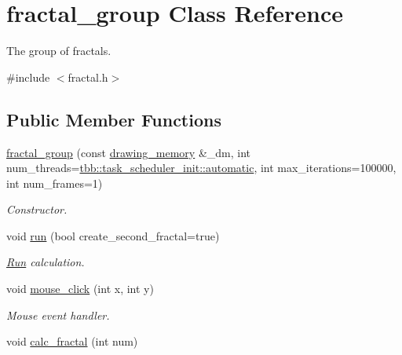 \hypertarget{classfractal__group}{}\section{fractal\+\_\+group Class Reference}
\label{classfractal__group}


The group of fractals.  




{\ttfamily \#include $<$fractal.\+h$>$}

\subsection*{Public Member Functions}
\begin{DoxyCompactItemize}
\item 
\hypertarget{classfractal__group_afb2577f7cdba0d281b49036b21a42886}{}\hyperlink{classfractal__group_afb2577f7cdba0d281b49036b21a42886}{fractal\+\_\+group} (const \hyperlink{classdrawing__memory}{drawing\+\_\+memory} \&\+\_\+dm, int num\+\_\+threads=\hyperlink{classtbb_1_1task__scheduler__init_a945886f5ef48300a8ebff2d077c166b1}{tbb\+::task\+\_\+scheduler\+\_\+init\+::automatic}, int max\+\_\+iterations=100000, int num\+\_\+frames=1)\label{classfractal__group_afb2577f7cdba0d281b49036b21a42886}

\begin{DoxyCompactList}\small\item\em Constructor. \end{DoxyCompactList}\item 
\hypertarget{classfractal__group_a73046c8830d160bbf2954e359be768a3}{}void \hyperlink{classfractal__group_a73046c8830d160bbf2954e359be768a3}{run} (bool create\+\_\+second\+\_\+fractal=true)\label{classfractal__group_a73046c8830d160bbf2954e359be768a3}

\begin{DoxyCompactList}\small\item\em \hyperlink{structRun}{Run} calculation. \end{DoxyCompactList}\item 
\hypertarget{classfractal__group_ad6ad304f5e437da450839b9e8170c50b}{}void \hyperlink{classfractal__group_ad6ad304f5e437da450839b9e8170c50b}{mouse\+\_\+click} (int x, int y)\label{classfractal__group_ad6ad304f5e437da450839b9e8170c50b}

\begin{DoxyCompactList}\small\item\em Mouse event handler. \end{DoxyCompactList}\item 
\hypertarget{classfractal__group_a8ba13e0c275f96bbd8365fc5c0adf670}{}void \hyperlink{classfractal__group_a8ba13e0c275f96bbd8365fc5c0adf670}{calc\+\_\+fractal} (int num)\label{classfractal__group_a8ba13e0c275f96bbd8365fc5c0adf670}


\end{DoxyCompactItemize}
